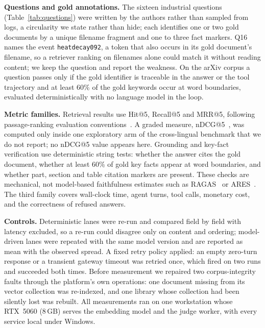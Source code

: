 \textbf{Questions and gold annotations.} The sixteen industrial questions (Table~\ref{tab:questions}) were written by the authors rather than sampled from logs, a circularity we state rather than hide; each identifies one or two gold documents by a unique filename fragment and one to three fact markers. Q16 names the event \texttt{heatdecay092}, a token that also occurs in its gold document's filename, so a retriever ranking on filenames alone could match it without reading content; we keep the question and report the weakness. On the arXiv corpus a question passes only if the gold identifier is traceable in the answer or the tool trajectory and at least 60\% of the gold keywords occur at word boundaries, evaluated deterministically with no language model in the loop.



\textbf{Metric families.} Retrieval results use Hit@5, Recall@5 and MRR@5, following passage-ranking evaluation conventions~\cite{craswell-msmarco-2021}. A graded measure, nDCG@5~\cite{jarvelin-cumulated-gain-2002}, was computed only inside one exploratory arm of the cross-lingual benchmark that we do not report; no nDCG@5 value appears here. Grounding and key-fact verification use deterministic string tests: whether the answer cites the gold document, whether at least 60\% of gold key facts appear at word boundaries, and whether part, section and table citation markers are present. These checks are mechanical, not model-based faithfulness estimates such as RAGAS~\cite{es-ragas-2024} or ARES~\cite{saad-falcon-ares-2024}. The third family covers wall-clock time, agent turns, tool calls, monetary cost, and the correctness of refused answers.

\textbf{Controls.} Deterministic lanes were re-run and compared field by field with latency excluded, so a re-run could disagree only on content and ordering; model-driven lanes were repeated with the same model version and are reported as mean with the observed spread. A fixed retry policy applied: an empty zero-turn response or a transient gateway timeout was retried once, which fired on two runs and succeeded both times. Before measurement we repaired two corpus-integrity faults through the platform's own operations: one document missing from its vector collection was re-indexed, and one library whose collection had been silently lost was rebuilt. All measurements ran on one workstation whose RTX~5060 (8\,GB) serves the embedding model and the judge worker, with every service local under Windows.

